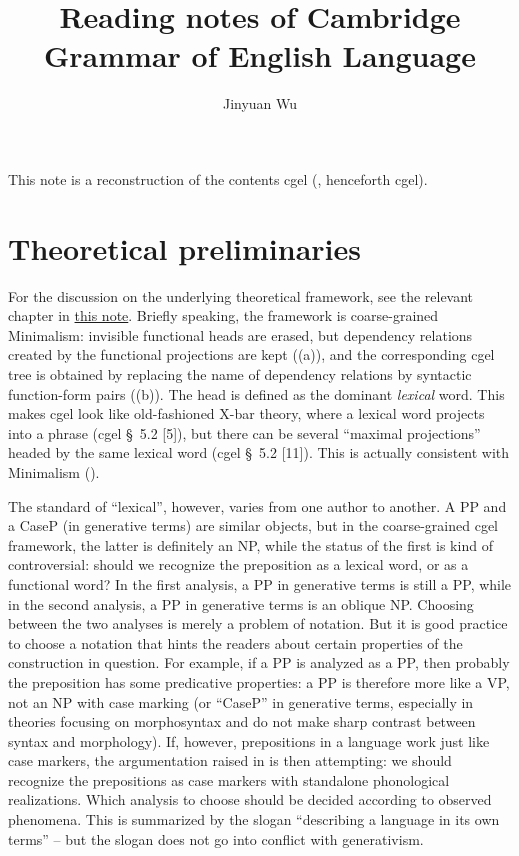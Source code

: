 \documentclass{article}
\title{Reading notes of Cambridge Grammar of English Language}
\author{Jinyuan Wu}
\newcommand*{\citesec}[1]{\S~{#1}}
\begin{document}
\maketitle

\automath

This note is a reconstruction of the contents \acl{cgel} (\citealt{cgel}, henceforth \acs{cgel}). 

\section{Theoretical preliminaries}\label{sec:theory}

For the discussion on the underlying theoretical framework, 
see the relevant chapter in \href{../Chinese/main.pdf}{this note}.
Briefly speaking, the framework is coarse-grained Minimalism:
invisible functional heads are erased,
but dependency relations created by the functional projections are kept ((a)),
and the corresponding \ac{cgel} tree is obtained by replacing the name of dependency relations 
by syntactic function-form pairs ((b)).
The head is defined as the dominant \emph{lexical} word.
This makes \ac{cgel} look like old-fashioned X-bar theory, 
where a lexical word projects into a phrase (\ac{cgel} \citesec{5.2} [5]),
but there can be several ``maximal projections'' headed by the same lexical word (\ac{cgel} \citesec{5.2 [11]}).
This is actually consistent with Minimalism ().

The standard of ``lexical'', however, varies from one author to another.
A PP and a CaseP (in generative terms) are similar objects,
but in the coarse-grained \ac{cgel} framework,
the latter is definitely an NP, 
while the status of the first is kind of controversial:
should we recognize the preposition as a lexical word,
or as a functional word?
In the first analysis, a PP in generative terms is still a PP,
while in the second analysis, a PP in generative terms is an oblique NP.
Choosing between the two analyses is merely a problem of notation.
But it is good practice to choose a notation that hints the readers about 
certain properties of the construction in question.
For example, if a PP is analyzed as a PP, then probably the preposition has some predicative properties:
a PP is therefore more like a VP, not an NP with case marking 
(or ``CaseP'' in generative terms, especially in theories focusing on morphosyntax 
and do not make sharp contrast between syntax and morphology).
If, however, prepositions in a language work just like case markers,
the argumentation raised in \citet[\citesec{1.11}, \citesec{5.4}]{dixon2009basic1} is then attempting:
we should recognize the prepositions as case markers with standalone phonological realizations.
Which analysis to choose should be decided according to observed phenomena.
This is summarized by the slogan ``describing a language in its own terms''
-- but the slogan does not go into conflict with generativism.
\end{document}
